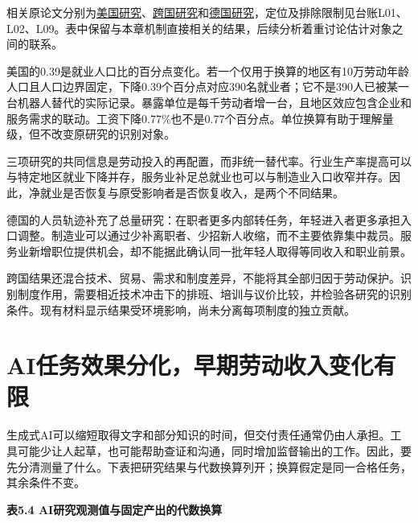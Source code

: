 \documentclass[UTF8,fontset=windows,12pt,a4paper,oneside,openany]{ctexbook}
\begin{document}
相关原论文分别为\href{https://doi.org/10.1086/705716}{美国研究}、\href{https://doi.org/10.1162/rest_a_00754}{跨国研究}和\href{https://doi.org/10.1093/jeea/jvab012}{德国研究}，定位及排除限制见台账L01、L02、L09。表中保留与本章机制直接相关的结果，后续分析着重讨论估计对象之间的联系。

美国的0.39是就业人口比的百分点变化。若一个仅用于换算的地区有10万劳动年龄人口且人口边界固定，下降0.39个百分点对应390名就业者；它不是390人已被某一台机器人替代的实际记录。暴露单位是每千劳动者增一台，且地区效应包含企业和服务需求的联动。工资下降0.77\%也不是0.77个百分点。单位换算有助于理解量级，但不改变原研究的识别对象。

三项研究的共同信息是劳动投入的再配置，而非统一替代率。行业生产率提高可以与特定地区就业下降并存，服务业补足总就业也可以与制造业入口收窄并存。因此，净就业是否恢复与原受影响者是否恢复收入，是两个不同结果。

德国的人员轨迹补充了总量研究：在职者更多内部转任务，年轻进入者更多承担入口调整。制造业可以通过少补离职者、少招新人收缩，而不主要依靠集中裁员。服务业新增职位提供机会，却不能据此确认同一批年轻人取得等同收入和职业前景。

跨国结果还混合技术、贸易、需求和制度差异，不能将其全部归因于劳动保护。识别制度作用，需要相近技术冲击下的排班、培训与议价比较，并检验各研究的识别条件。现有材料显示结果受环境影响，尚未分离每项制度的独立贡献。

\section{AI任务效果分化，早期劳动收入变化有限}

生成式AI可以缩短取得文字和部分知识的时间，但交付责任通常仍由人承担。工具可能少让人起草，也可能帮助查证和沟通，同时增加监督输出的工作。因此，要先分清测量了什么。下表把研究结果与代数换算列开；换算假定是同一合格任务，其余条件不变。

\textbf{表5.4 AI研究观测值与固定产出的代数换算}
\end{document}

